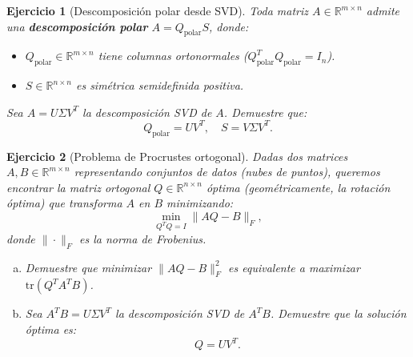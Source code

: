 \documentclass[12pt]{article}
\newtheorem{exercise}{Ejercicio}
\begin{document}
\begin{exercise}[Descomposición polar desde SVD]
Toda matriz $A \in \mathbb{R}^{m \times n}$ admite una \textbf{descomposición polar} $A = Q_{\text{polar}} S$, donde:
\begin{itemize}
\item $Q_{\text{polar}} \in \mathbb{R}^{m \times n}$ tiene columnas ortonormales ($Q_{\text{polar}}^T Q_{\text{polar}} = I_n$).
\item $S \in \mathbb{R}^{n \times n}$ es simétrica semidefinida positiva.
\end{itemize}

Sea $A = U\Sigma V^T$ la descomposición SVD de $A$. Demuestre que:
\[
Q_{\text{polar}} = UV^T, \quad S = V\Sigma V^T.
\]

\end{exercise}

\begin{exercise}[Problema de Procrustes ortogonal]
Dadas dos matrices $A, B \in \mathbb{R}^{m \times n}$ representando conjuntos de datos (nubes de puntos), queremos encontrar la matriz ortogonal $Q \in \mathbb{R}^{n \times n}$ óptima (geométricamente, la rotación óptima) que transforma $A$ en $B$ minimizando:
\[
\min_{Q^TQ = I} \|AQ - B\|_F,
\]
donde $\|\cdot\|_F$ es la norma de Frobenius.

\begin{enumerate}[(a)]
\item Demuestre que minimizar $\|AQ - B\|_F^2$ es equivalente a maximizar $\text{tr}(Q^T A^T B)$.
\item Sea $A^TB = U\Sigma V^T$ la descomposición SVD de $A^TB$. Demuestre que la solución óptima es:
\[
Q = UV^T.
\]
\end{enumerate}
\end{exercise}
\end{document}
